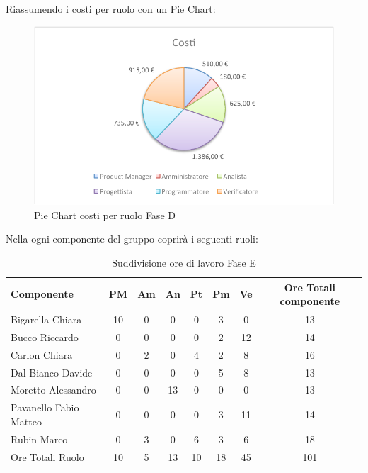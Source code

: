 				Riassumendo i costi per ruolo con un Pie Chart:
				\begin{figure}[H]\centering
					\includegraphics[width=\textwidth]{PianoDiProgetto/Pics/ChartTotCostiFaseD.pdf}
					\caption{Pie Chart costi per ruolo Fase D}
				\end{figure}
				Nella  ogni componente del gruppo \groupname{} coprirà i seguenti ruoli:
				\begin{table}[H]
					\begin{center}
						\begin{tabular}{| l | c | c | c | c | c | c | c |}
							\hline
							Componente 				& PM	& Am	& An 	& Pt 		& Pm 	& Ve 	& Ore Totali componente \\ \hline
							
							Bigarella Chiara 			& 10 		& 0		& 0		& 0		& 3 		& 0		& 13 \\
							Bucco Riccardo 			& 0		& 0		& 0		& 0		& 2		& 12 		& 14 \\
							Carlon Chiara	 			& 0		& 2 		& 0		& 4 		& 2 		& 8 		& 16 \\
							Dal Bianco Davide 			& 0		& 0		& 0		& 0		& 5 		& 8 		& 13 \\
							Moretto Alessandro 			& 0		& 0		& 13 		& 0		& 0		& 0		& 13 \\
							Pavanello Fabio Matteo	 	& 0		& 0		& 0		& 0		& 3 		&11 		& 14 \\
							Rubin Marco				& 0		& 3 		& 0		& 6 		& 3 		& 6		& 18 \\ \hline \hline
							
							Ore Totali Ruolo 			& 10 		& 5 		& 13 		& 10 		& 18 		& 45 		& 101\\ \hline
						\end{tabular}
					\end{center}
					\caption{Suddivisione ore di lavoro Fase E}
				\end{table}
